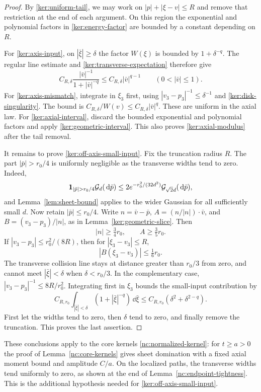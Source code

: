 \begin{proof}
By \eqref{ker:uniform-tail}, we may work on
$|p|+|\xi-v|\leq R$ and remove that restriction at the end of each
argument. On this region the exponential and polynomial factors in
\eqref{ker:energy-factor} are bounded by a constant depending on $R$.

For \eqref{ker:axis-input}, on $|\bar\xi|\geq\delta$ the factor
$W(\xi)$ is bounded by $1+\delta^{-q}$. The regular line estimate
and \eqref{ker:transverse-expectation} therefore give
\[
 C_{R,\delta}\frac{|\bar v|^{-1}}{1+|\bar v|^{-q}}
 \leq C_{R,\delta}|\bar v|^{q-1}
 \qquad(0<|\bar v|\leq1).
\]
For \eqref{ker:axis-mismatch}, integrate in $\xi_3$ first, using
$|v_3-p_3|^{-1}\leq\delta^{-1}$ and
\eqref{ker:disk-singularity}. The bound is
$C_{R,\delta}/W(v)\leq C_{R,\delta}|\bar v|^q$.
These are uniform in the axial law. For
\eqref{ker:axial-interval}, discard the bounded exponential and
polynomial factors and apply
\eqref{ker:geometric-interval}. This also proves
\eqref{ker:axial-modulus} after the tail removal.

It remains to prove \eqref{ker:off-axis-small-input}. Fix the
truncation radius $R$. The part $|\bar p|>r_0/4$ is uniformly
negligible as the transverse widths tend to zero. Indeed,
\[
 \ind_{|\bar p|>r_0/4}\mathcal G_d(\dd\bar p)
 \leq2e^{-r_0^2/(32d^2)}\mathcal G_{\sqrt2d}(\dd\bar p),
\]
and Lemma~\ref{lem:sheet-bound} applies to the wider Gaussian for
all sufficiently small $d$. Now retain $|\bar p|\leq r_0/4$.
Write $n=\bar v-\bar p$, $A=(n/|n|)\cdot\bar v$, and
$B=(v_3-p_3)/|n|$, as in Lemma~\ref{ker:geometric-slice}. Then
\[
 |n|\geq\tfrac34r_0,\qquad A\geq\tfrac35r_0.
\]
If $|v_3-p_3|\leq r_0^2/(8R)$, then for
$|\xi_3-v_3|\leq R$,
\[
 |B(\xi_3-v_3)|\leq\tfrac16r_0.
\]
The transverse collision line stays at distance greater than
$r_0/3$ from zero, and cannot meet $|\bar\xi|<\delta$ when
$\delta<r_0/3$. In the complementary case,
$|v_3-p_3|^{-1}\leq8R/r_0^2$. Integrating first in $\xi_3$ bounds
the small-input contribution by
\[
 C_{R,r_0}\int_{|\bar\xi|<\delta}
               (1+|\bar\xi|^{-q})\,\dd\bar\xi
 \leq C_{R,r_0}(\delta^2+\delta^{2-q}).
\]
First let the widths tend to zero, then $\delta$ tend to zero, and
finally remove the truncation. This proves the last assertion.
\end{proof}

These conclusions apply to the core kernels
\eqref{nc:normalized-kernel}: for $t\geq a>0$ the proof of
Lemma~\ref{nc:core-kernels} gives sheet domination with a fixed axial
moment bound and amplitude $C/a$. On the localized paths, the
transverse widths tend uniformly to zero, as shown at the end of
Lemma~\ref{nc:endpoint-tightness}. This is the additional hypothesis
needed for \eqref{ker:off-axis-small-input}.

